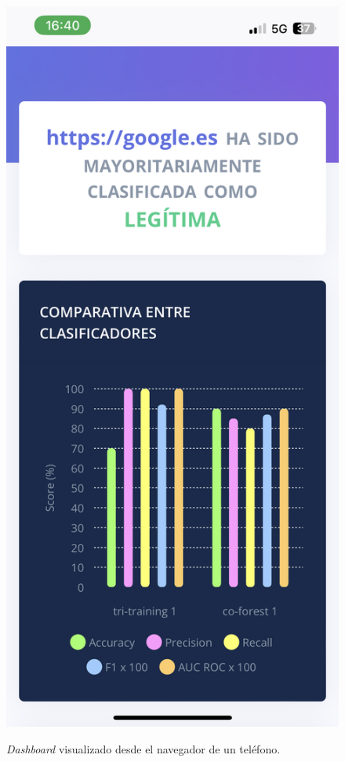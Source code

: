 \begin{figure}[h]
	\caption[Manual de usuario: \textit{dashboard} (versión móvil)]{\textit{Dashboard} visualizado desde el navegador de un teléfono.}
	\centering
	\includegraphics[scale=0.1]{../img/anexos/user_guide/0_dashboard_mobile}
	\label{e-0:dashboard-mobile}
\end{figure}

